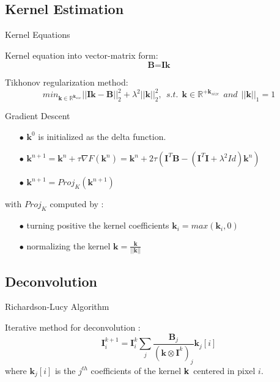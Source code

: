 \documentclass[french]{beamer}
\newcommand{\I}{\textbf{I}}
\newcommand{\B}{\textbf{B}}
\newcommand{\kernel}{\textbf{k}}
\newcommand{\ksize}{\textbf{k$_{size}$}}
\theoremstyle{plain}
\theoremstyle{remark}
\begin{document}
\subsection{Kernel Estimation}

\begin{frame}{Kernel Equations}

Kernel equation into vector-matrix form:
\[
	\B = \I\kernel
\]

\pause

Tikhonov regularization method:
\[
min_{\kernel \in \mathbb{R}^{\ksize}} ||\I\kernel - \B||_2^2 + \lambda^2||\kernel||_2^2, \ \ s.t. \ \ \kernel \in \mathbb{R}^{+\ksize} \ \ and \ \ ||\kernel||_1 = 1 
\]

\end{frame}

\begin{frame}{Gradient Descent}

\begin{itemize}
	\item[$\bullet$] $\kernel^0$ is initialized as the delta function.
	\pause
	\item[$\bullet$] $\kernel^{n+1} = \kernel^n + \tau\nabla F(\kernel^n) = \kernel^n + 2\tau(\I^T\B - (\I^T\I +\lambda^2Id)\kernel^n)$
	\pause
	\item[$\bullet$] $\kernel^{n+1} = Proj_K(\kernel^{n+1})$
\end{itemize}

\pause

with $Proj_K$ computed by :
\begin{itemize}
	\item[$\bullet$] turning positive the kernel coefficients $\kernel_i= max(\kernel_i, 0)$
	\pause
	\item[$\bullet$] normalizing the kernel $\kernel = \frac{\kernel}{||\kernel||}$
\end{itemize}

\end{frame}

\subsection{Deconvolution}

\begin{frame}{Richardson-Lucy Algorithm}

Iterative method for deconvolution :
\[
	\I^{k+1} _i= \I^k_i \sum_{j}\frac{\B_j}{(\kernel \otimes \I^k)_j} \kernel_j[i]
\]
where $\kernel_j[i]$ is the $j^{th}$ coefficients of the kernel \kernel\ centered in pixel $i$.

\end{frame}
\end{document}
